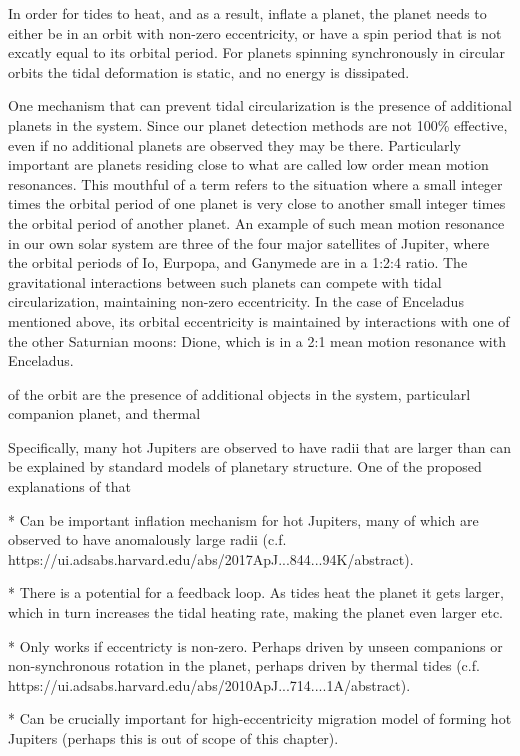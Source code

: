 In order for tides to heat, and as a result, inflate a planet, the planet needs
to either be in an orbit with non-zero eccentricity, or have a spin period that
is not excatly equal to its orbital period. For planets spinning synchronously
in circular orbits the tidal deformation is static, and no energy is dissipated.

One mechanism that can prevent tidal circularization is the presence of
additional planets in the system. Since our planet detection methods are not
100\% effective, even if no additional planets are observed they may be there.
Particularly important are planets residing close to what are called low order
mean motion resonances. This mouthful of a term refers to the situation where a
small integer times the orbital period of one planet is very close to another
small integer times the orbital period of another planet. An example of such
mean motion resonance in our own solar system are three of the four major
satellites of Jupiter, where the orbital periods of Io, Eurpopa, and Ganymede
are in a 1:2:4 ratio. The gravitational interactions between such planets can
compete with tidal circularization, maintaining non-zero eccentricity. In the
case of Enceladus mentioned above, its orbital eccentricity is maintained by
interactions with one of the other Saturnian moons: Dione, which is in a 2:1
mean motion resonance with Enceladus.

of the orbit are the presence of additional objects in the
system, particularl companion planet, and thermal

Specifically, many hot Jupiters are observed to have radii that are larger than
can be explained by standard models of planetary structure. One of the proposed
explanations of that

 * Can be important inflation mechanism for hot Jupiters, many of which are
 observed to have anomalously large radii (c.f.
 https://ui.adsabs.harvard.edu/abs/2017ApJ...844...94K/abstract).

 * There is a potential for a feedback loop. As tides heat the planet it gets
 larger, which in turn increases the tidal heating rate, making the planet even
 larger etc.

 * Only works if eccentricty is non-zero. Perhaps driven by unseen companions or
 non-synchronous rotation in the planet, perhaps driven by thermal tides (c.f.
 https://ui.adsabs.harvard.edu/abs/2010ApJ...714....1A/abstract).

 * Can be crucially important for high-eccentricity migration model of forming
 hot Jupiters (perhaps this is out of scope of this chapter).
